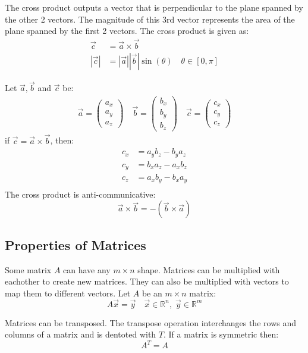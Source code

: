 \documentclass[11pt, a4paper]{article}
\newcommand*{\R}{\ensuremath{\mathbb{R}}}
\begin{document}
The cross product outputs a vector that is perpendicular to the plane spanned by the other 2 vectors. The magnitude of this 3rd vector represents the area of the plane spanned by the first 2 vectors. The cross product is given as:
\begin{align*}
  \vec{c} &= \vec{a} \times \vec{b}\\
  |\vec{c}| &= |\vec{a}||\vec{b}|\sin(\theta) \quad \theta \in [0, \pi]
\end{align*}

Let $\vec{a}, \vec{b}$ and $\vec{c}$ be:
\begin{gather*}
  \vec{a} = \begin{pmatrix} a_x \\ a_y \\ a_z \end{pmatrix} \quad
  \vec{b} = \begin{pmatrix} b_x \\ b_y \\ b_z \end{pmatrix} \quad
  \vec{c} = \begin{pmatrix} c_x \\ c_y \\ c_z \end{pmatrix}
\end{gather*}
if $\vec{c} = \vec{a} \times \vec{b}$, then:
\begin{align*}
  c_x &= a_yb_z - b_ya_z\\
  c_y &= b_xa_z - a_xb_z\\
  c_z &= a_xb_y - b_xa_y\\
\end{align*}
The cross product is anti-communicative:
\begin{equation*}
  \vec{a} \times \vec{b} = -(\vec{b} \times \vec{a})
\end{equation*}


\subsection{Properties of Matrices}
Some matrix $A$ can have any $m \times n$ shape. Matrices can be multiplied with eachother to create new matrices. They can also be multiplied with vectors to map them to different vectors. Let $A$ be an $m \times n$ matrix:
\begin{equation*}
  A\vec{x} = \vec{y} \quad \vec{x} \in \R^n ,\; \vec{y} \in \R^m
\end{equation*}

Matrices can be transposed. The transpose operation interchanges the rows and columns of a matrix and is dentoted with $T$. If a matrix is symmetric then:
\begin{equation*}
  A^T = A
\end{equation*}
\end{document}
